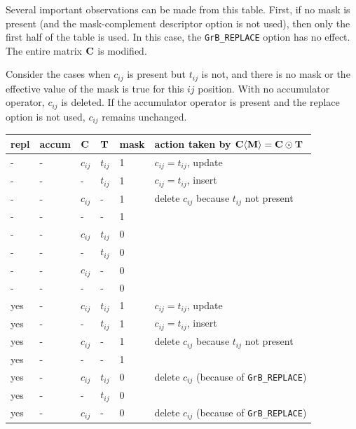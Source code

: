 Several important observations can be made from this table.  First,
if no mask is present (and the mask-complement descriptor option is not used),
then only the first half of the table is used.  In this case, the \verb'GrB_REPLACE'
option has no effect.  The entire matrix ${\bf C}$ is modified.

Consider the cases when $c_{ij}$ is present but $t_{ij}$ is not, and there is no
mask or the effective value of the mask is true for this ${ij}$ position.  With
no accumulator operator, $c_{ij}$ is deleted.  If the accumulator operator is
present and the replace option is not used, $c_{ij}$ remains unchanged.

\begin{table}
{\small
\begin{tabular}{lllll|l}
\hline
repl & accum & ${\bf C}$ & ${\bf T}$ & mask & action taken by ${\bf C \langle M \rangle = C \odot T}$ \\
\hline
    -  &-   & $c_{ij}$ & $t_{ij}$  & 1    &  $c_{ij} = t_{ij}$, update \\
    -  &-   &  -       & $t_{ij}$  & 1    &  $c_{ij} = t_{ij}$, insert \\
    -  &-   & $c_{ij}$ &  -        & 1    &  delete $c_{ij}$ because $t_{ij}$ not present \\
    -  &-   &  -       &  -        & 1    &   \\
    -  &-   & $c_{ij}$ & $t_{ij}$  & 0    &   \\
    -  &-   &  -       & $t_{ij}$  & 0    &   \\
    -  &-   & $c_{ij}$ &  -        & 0    &   \\
    -  &-   &  -       &  -        & 0    &   \\
\hline
    yes&-   & $c_{ij}$ & $t_{ij}$  & 1    &  $c_{ij} = t_{ij}$, update \\
    yes&-   &  -       & $t_{ij}$  & 1    &  $c_{ij} = t_{ij}$, insert \\
    yes&-   & $c_{ij}$ &  -        & 1    &  delete $c_{ij}$ because $t_{ij}$ not present \\
    yes&-   &  -       &  -        & 1    &   \\
    yes&-   & $c_{ij}$ & $t_{ij}$  & 0    &  delete $c_{ij}$  (because of \verb'GrB_REPLACE') \\
    yes&-   &  -       & $t_{ij}$  & 0    &   \\
    yes&-   & $c_{ij}$ &  -        & 0    &  delete $c_{ij}$  (because of \verb'GrB_REPLACE') \\

\end{tabular}}
\end{table}
